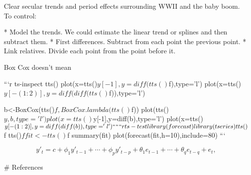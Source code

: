 \documentclass{article}
\begin{document}
Clear secular trends and period effects surrounding WWII and the baby boom. To control:

* Model the trends. We could estimate the linear trend or splines and then subtract them.
* First differences. Subtract from each point the previous point.
* Link relatives. Divide each point from the point before it.

Box Cox doesn't mean

```{r ts-inspect}
tts() %
plot(x=tts()$y[-1],y=diff(tts()$f),type='l')
plot(x=tts()$y[-(1:2)],y=diff(diff(tts()$f)),type='l')

b<-BoxCox(tts()$f,BoxCox.lambda(tts()$f))
plot(tts()$y,b,type='l')
plot(x=tts()$y[-1],y=diff(b),type='l')
plot(x=tts()$y[-(1:2)],y=diff(diff(b)),type='l')
```

```{r ts-test}
library(forecast)
library(tseries)
tts()$f %
tts()$f %
fit<-tts()$f %
summary(fit)
plot(forecast(fit,h=10),include=80)
```

\begin{equation}\tag{8.1}\label{eq-8-arima} y'_{t} = c +
\phi_{1}y'_{t-1} + \cdots + \phi_{p}y'_{t-p} +
\theta_{1}e_{t-1} + \cdots + \theta_{q}e_{t-q} + e_{t},
\end{equation}

# References
\end{document}

